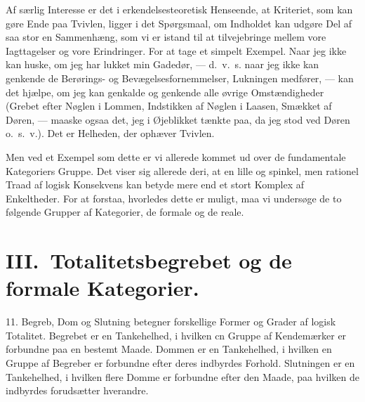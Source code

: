 \documentclass[12pt]{article}
\newcommand{\opage}[1]{\marginnote{\footnotesize\textit{[#1]}}}
\begin{document}
Af særlig Interesse er det i erkendelsesteoretisk Henseende, at Kriteriet, som
kan gøre Ende paa Tvivlen, ligger i det Spørgsmaal, om Indholdet kan udgøre Del
af saa stor en Sammenhæng, som vi er istand til at tilvejebringe mellem vore
Iagttagelser og vore Erindringer. For at tage et simpelt Exempel. Naar jeg ikke kan
huske, om jeg har lukket min Gadedør, --- d.~v.~s. naar jeg ikke kan genkende de
Berørings- og Bevægelsesfornemmelser, Lukningen medfører, --- kan det hjælpe, om
jeg kan genkalde og genkende alle øvrige Omstændigheder (Grebet efter Nøglen i
Lommen, Indstikken af Nøglen i Laasen, Smækket af Døren, --- maaske ogsaa det,
\opage{31}jeg i Øjeblikket tænkte paa, da jeg stod ved Døren o.~s.~v.). Det er Helheden, der
ophæver Tvivlen.

Men ved et Exempel som dette er vi allerede kommet ud over de fundamentale
Kategoriers Gruppe. Det viser sig allerede deri, at en lille og spinkel, men
rationel Traad af logisk Konsekvens kan betyde mere end et stort Komplex af
Enkeltheder. For at forstaa, hvorledes dette er muligt, maa vi undersøge de to
følgende Grupper af Kategorier, de formale og de reale.

\section*{III.\ Totalitetsbegrebet og de formale Kategorier.}

11. Begreb, Dom og Slutning betegner forskellige Former og Grader af logisk
Totalitet. Begrebet er en Tankehelhed, i hvilken cn Gruppe af Kendemærker er
forbundne paa en bestemt Maade. Dommen er en Tankehelhed, i hvilken en Gruppe
af Begreber er forbundne efter deres indbyrdes Forhold. Slutningen er en
Tankehelhed, i hvilken flere Domme er forbundne efter den Maade, paa hvilken de
indbyrdes forudsætter hverandre.
\end{document}
